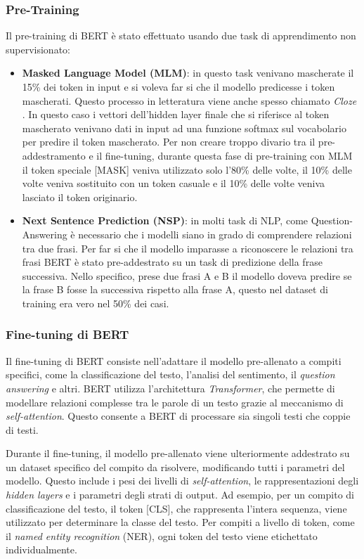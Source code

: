 \documentclass[../../Thesis.tex]{subfiles}
\begin{document}
\subsubsection{Pre-Training}
Il pre-training di BERT è stato effettuato usando due task di apprendimento non supervisionato: 
\begin{itemize}
    \item \textbf{Masked Language Model (MLM)}: in questo task venivano mascherate il 15\% dei token in input e si voleva far si che il modello predicesse i token mascherati. Questo processo in letteratura viene anche spesso chiamato \emph{Cloze} \cite{Taylor1953}. In questo caso i vettori dell'hidden layer finale che si riferisce al token mascherato venivano dati in input ad una funzione softmax sul vocabolario per predire il token mascherato. Per non creare troppo divario tra il pre-addestramento e il fine-tuning, durante questa fase di pre-training con MLM il token speciale [MASK] veniva utilizzato solo l'80\% delle volte, il 10\% delle volte veniva sostituito con un token casuale e il 10\% delle volte veniva lasciato il token originario.
    \item \textbf{Next Sentence Prediction (NSP)}: in molti task di NLP, come Question-Answering è necessario che i modelli siano in grado di comprendere relazioni tra due frasi. Per far si che il modello imparasse a riconoscere le relazioni tra frasi BERT è stato pre-addestrato su un task di predizione della frase successiva. Nello specifico, prese due frasi A e B il modello doveva predire se la frase B fosse la successiva rispetto alla frase A, questo nel dataset di training era vero nel 50\% dei casi. 
\end{itemize}

\subsubsection{Fine-tuning di BERT}

Il fine-tuning di BERT consiste nell'adattare il modello pre-allenato a compiti specifici, come la classificazione del testo, l'analisi del sentimento, il \textit{question answering} e altri. BERT utilizza l'architettura \textit{Transformer}, che permette di modellare relazioni complesse tra le parole di un testo grazie al meccanismo di \textit{self-attention}. Questo consente a BERT di processare sia singoli testi che coppie di testi.

Durante il fine-tuning, il modello pre-allenato viene ulteriormente addestrato su un dataset specifico del compito da risolvere, modificando tutti i parametri del modello. Questo include i pesi dei livelli di \textit{self-attention}, le rappresentazioni degli \textit{hidden layers} e i parametri degli strati di output. Ad esempio, per un compito di classificazione del testo, il token [CLS], che rappresenta l'intera sequenza, viene utilizzato per determinare la classe del testo. Per compiti a livello di token, come il \textit{named entity recognition} (NER), ogni token del testo viene etichettato individualmente.
\end{document}

